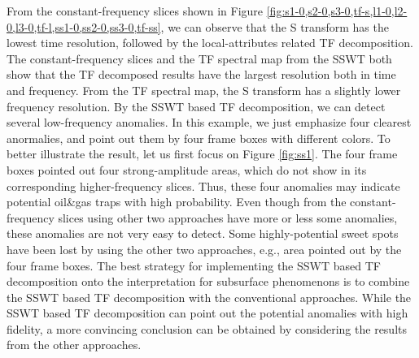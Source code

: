 From the constant-frequency slices shown in Figure \ref{fig:s1-0,s2-0,s3-0,tf-s,l1-0,l2-0,l3-0,tf-l,ss1-0,ss2-0,ss3-0,tf-ss}, we can observe that the S transform has the lowest time resolution, followed by the local-attributes related TF decomposition. The constant-frequency slices and the TF spectral map from the SSWT both show that the TF decomposed results have the largest resolution both in time and frequency. From the TF spectral map, the S transform has a slightly lower frequency resolution. By the SSWT based TF decomposition, we can detect several low-frequency anomalies. In this example, we just emphasize four clearest anormalies, and point out them by four frame boxes with different colors. To better illustrate the result, let us first focus on Figure \ref{fig:ss1}. The four frame boxes pointed out four strong-amplitude areas, which do not show in its corresponding higher-frequency slices. Thus, these four anomalies may indicate potential oil\&gas traps with high probability. Even though from the constant-frequency slices using other two approaches have more or less some anomalies, these anomalies are not very easy to detect. Some highly-potential sweet spots have been lost by using the other two approaches, e.g., area pointed out by the four frame boxes. The best strategy for implementing the SSWT based TF decomposition onto the interpretation for subsurface phenomenons is to combine the SSWT based TF decomposition with the conventional approaches. While the SSWT based TF decomposition can point out the potential anomalies with high fidelity, a more convincing conclusion can be obtained by considering the results from the other approaches.




